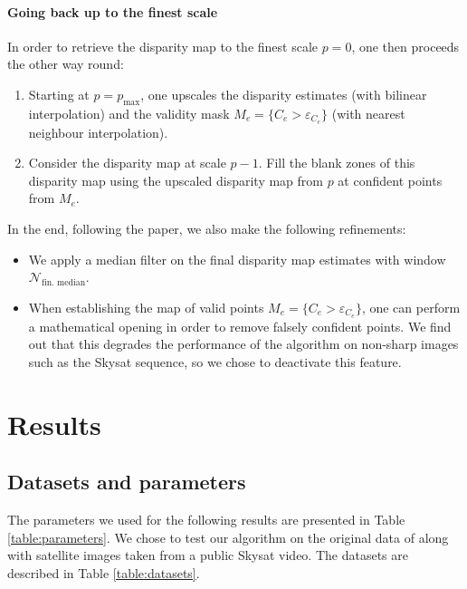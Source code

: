 \documentclass{article}
\theoremstyle{definition}
\begin{document}
\paragraph{Going back up to the finest scale} In order to retrieve the disparity map to the finest scale $p=0$, one then proceeds the other way round:
\begin{enumerate}
 \item Starting at $p=p_{\max}$, one upscales the disparity estimates (with bilinear interpolation) and the validity mask $M_e = \{C_e > \varepsilon_{C_e}\}$ (with nearest neighbour interpolation).
 \item Consider the disparity map at scale $p-1$. Fill the blank zones of this disparity map using the upscaled disparity map from $p$ at confident points from $M_e$.
\end{enumerate}


In the end, following the paper, we also make the following refinements:
\begin{itemize}
 \item We apply a median filter on the final disparity map estimates with window $\mathcal{N}_\text{fin. median}$.
 \item When establishing the map of valid points $M_e = \{C_e > \varepsilon_{C_e}\}$, one can perform a mathematical opening in order to remove falsely confident points. We find out that this degrades the performance of the algorithm on non-sharp images such as the Skysat sequence, so we chose to deactivate this feature.
\end{itemize}


\clearpage
\section{Results}


\subsection{Datasets and parameters} \label{subsec:dataset_params}


The parameters we used for the following results are presented in Table \ref{table:parameters}. We chose to test our algorithm on the original data of \cite{art:kim13:lfields} along with satellite images taken from a public Skysat video. The datasets are described in Table \ref{table:datasets}.
\end{document}
